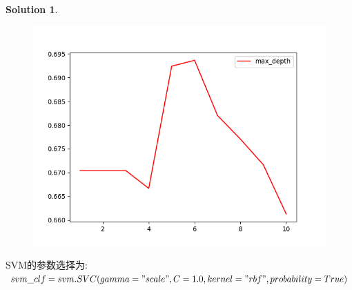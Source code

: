 \documentclass[a4paper,UTF8]{article}
\numberwithin{equation}{section}
\theoremstyle{definition}
\newtheorem*{solution}{Solution}
\begin{document}
\begin{solution}
\begin{figure}[H] \centering  \includegraphics[scale=0.5]{确定最优剪枝参数学习曲线.png} \end{figure}

SVM的参数选择为:$svm\_clf = svm.SVC(gamma="scale", C=1.0, kernel="rbf", probability=True)$
\end{solution}
\end{document}
